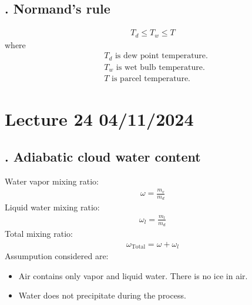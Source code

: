 \documentclass[fleqn,10pt]{SelfArx} %
\begin{document}
\subsection{. Normand's rule}
\begin{align}
    T_d \leq T_w \leq T
\end{align}
where
\begin{align*}
    &\text{$T_d$ is dew point temperature.}\\
    &\text{$T_w$ is wet bulb temperature.}\\
    &\text{$T$ is parcel temperature.}
\end{align*}

\clearpage

\section{Lecture 24 04/11/2024}

\subsection{. Adiabatic cloud water content}

Water vapor mixing ratio:
\begin{align}
    \omega = \frac{m_v}{m_d}
\end{align}
Liquid water mixing ratio:
\begin{align}
    \omega_l = \frac{m_l}{m_d}
\end{align}
Total mixing ratio:
\begin{align}
    \omega_{\text{Total}} = \omega + \omega_l
\end{align}
Assumpution considered are:
\begin{itemize}[noitemsep]
    \item Air contains only vapor and liquid water. There is no ice in air.
    \item Water does not precipitate during the process.
\end{itemize}
\end{document}
